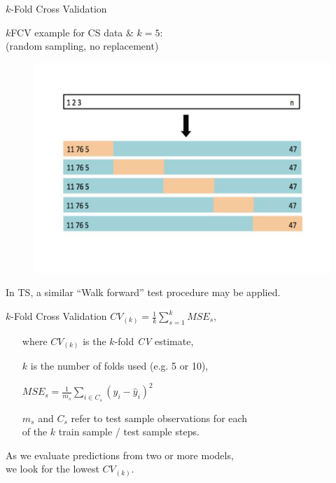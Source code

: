 \documentclass{beamer}
\begin{document}
\begin{frame}{$k$-Fold Cross Validation}
\begin{center}
$k$FCV example for CS data \& $k=5$: \\
(random sampling, no replacement)
\begin{figure}
\includegraphics[width=0.7\linewidth]{img/kFCV2.pdf}
\end{figure}
In TS, a similar ``Walk forward'' test procedure may be applied.
\end{center}
\end{frame}
\begin{frame}{$k$-Fold Cross Validation}
$ \textit{CV}_{(k)}= \frac{1}{k}\displaystyle\sum_{s=1}^{k} \textit{MSE}_s ,$
\vspace{0.3cm}
\begin{itemize}
\item [where] $\textit{CV}_{(k)}$ is the $k$-fold \textit{CV} estimate,
\item [ ] $k$ is the number of folds used (e.g. 5 or 10),
\item [ ] $\textit{MSE}_s = \frac{1}{m_s} \sum_{i \in C_s}^{}(y_i - \widehat{y}_i)^2 $ 
\item [ ] $m_s$ and $C_s$ refer to test sample  observations for each \\of the $k$ train sample / test sample steps.
\end{itemize}
\vspace{0.3cm}
As we evaluate predictions from two or more models, 
\\we look for the lowest $\textit{CV}_{(k)}$. 
\end{frame}
\end{document}
